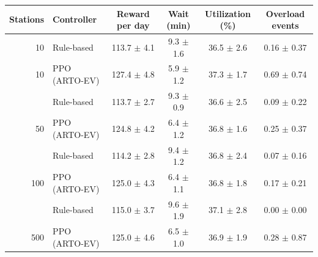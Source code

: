 \begin{tabular}{@{}rlcccc@{}}
\toprule
Stations & Controller & Reward per day & Wait (min) & Utilization (\%) & Overload events \\
\midrule
10 & Rule-based & 113.7 $\pm$ 4.1 & 9.3 $\pm$ 1.6 & 36.5 $\pm$ 2.6 & 0.16 $\pm$ 0.37 \\
10 & PPO (ARTO-EV) & 127.4 $\pm$ 4.8 & 5.9 $\pm$ 1.2 & 37.3 $\pm$ 1.7 & 0.69 $\pm$ 0.74 \\
\addlinespace[2pt]
50 & Rule-based & 113.7 $\pm$ 2.7 & 9.3 $\pm$ 0.9 & 36.6 $\pm$ 2.5 & 0.09 $\pm$ 0.22 \\
50 & PPO (ARTO-EV) & 124.8 $\pm$ 4.2 & 6.4 $\pm$ 1.2 & 36.8 $\pm$ 1.6 & 0.25 $\pm$ 0.37 \\
\addlinespace[2pt]
100 & Rule-based & 114.2 $\pm$ 2.8 & 9.4 $\pm$ 1.2 & 36.8 $\pm$ 2.4 & 0.07 $\pm$ 0.16 \\
100 & PPO (ARTO-EV) & 125.0 $\pm$ 4.3 & 6.4 $\pm$ 1.1 & 36.8 $\pm$ 1.8 & 0.17 $\pm$ 0.21 \\
\addlinespace[2pt]
500 & Rule-based & 115.0 $\pm$ 3.7 & 9.6 $\pm$ 1.9 & 37.1 $\pm$ 2.8 & 0.00 $\pm$ 0.00 \\
500 & PPO (ARTO-EV) & 125.0 $\pm$ 4.6 & 6.5 $\pm$ 1.0 & 36.9 $\pm$ 1.9 & 0.28 $\pm$ 0.87 \\
\bottomrule
\end{tabular}